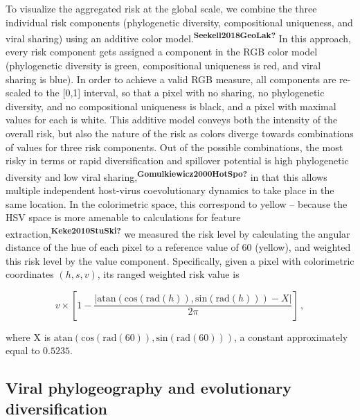 \documentclass[10pt,oneside]{article}
\begin{document}
To visualize the aggregated risk at the global scale, we combine the
three individual risk components (phylogenetic diversity, compositional
uniqueness, and viral sharing) using an additive color
model.\textsuperscript{\textbf{Seekell2018GeoLak?}} In this approach,
every risk component gets assigned a component in the RGB color model
(phylogenetic diversity is green, compositional uniqueness is red, and
viral sharing is blue). In order to achieve a valid RGB measure, all
components are re-scaled to the {[}0,1{]} interval, so that a pixel with
no sharing, no phylogenetic diversity, and no compositional uniqueness
is black, and a pixel with maximal values for each is white. This
additive model conveys both the intensity of the overall risk, but also
the nature of the risk as colors diverge towards combinations of values
for three risk components. Out of the possible combinations, the most
risky in terms or rapid diversification and spillover potential is high
phylogenetic diversity and low viral
sharing,\textsuperscript{\textbf{Gomulkiewicz2000HotSpo?}} in that this
allows multiple independent host-virus coevolutionary dynamics to take
place in the same location. In the colorimetric space, this correspond
to yellow -- because the HSV space is more amenable to calculations for
feature extraction,\textsuperscript{\textbf{Keke2010StuSki?}} we
measured the risk level by calculating the angular distance of the hue
of each pixel to a reference value of 60 (yellow), and weighted this
risk level by the value component. Specifically, given a pixel with
colorimetric coordinates \((h,s,v)\), its ranged weighted risk value is

\[
v\times\left[1-\frac{\left|\text{atan}\left(\text{cos}(\text{rad}(h)), \text{sin}(\text{rad}(h))\right) - X\right|}{2\pi}\right]\,,
\]

where X is
\(\text{atan}\left(\text{cos}(\text{rad}(60)), \text{sin}(\text{rad}(60))\right)\),
a constant approximately equal to \(0.5235\).

\hypertarget{viral-phylogeography-and-evolutionary-diversification}{%
\subsection{Viral phylogeography and evolutionary
diversification}\label{viral-phylogeography-and-evolutionary-diversification}}
\end{document}
